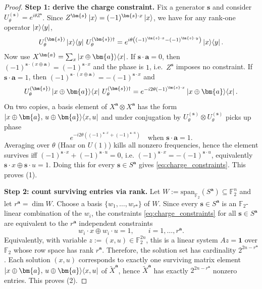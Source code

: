 \documentclass[a4paper,onecolumn,notitlepage,nofootinbib,longbibliography,superscriptaddress, floatfix, pra, aps, 10pt]{revtex4-2}
\newcommand{\vta}{{\bm{a}}}
\newcommand{\vts}{{\bm{s}}}
\begin{document}
\begin{proof}
\textbf{Step 1: derive the charge constraint.}
Fix a generator $\vts$ and consider $U_\theta^{(\vts)}=e^{i\theta Z^\vts}$.
Since $Z^\vts\ket{x}=(-1)^{\vts\cdot x}\ket{x}$, we have for any rank-one operator $\ket{x}\!\bra{y}$,
\[
U_\theta^{(\vts)}\ket{x}\!\bra{y}\,U_\theta^{(\vts)\dagger}
=
e^{i\theta\left((-1)^{\vts\cdot x}-(-1)^{\vts\cdot y}\right)}\ket{x}\!\bra{y}.
\]
Now use $X^\vta=\sum_x\ket{x\oplus\vta}\!\bra{x}$.
If $\vts\cdot\vta=0$, then $(-1)^{\vts\cdot(x\oplus\vta)}=(-1)^{\vts\cdot x}$ and the phase is $1$, i.e.\ $Z^\vts$ imposes no constraint.
If $\vts\cdot\vta=1$, then $(-1)^{\vts\cdot(x\oplus\vta)}=-(-1)^{\vts\cdot x}$ and
\[
U_\theta^{(\vts)}\ket{x\oplus\vta}\!\bra{x}\,U_\theta^{(\vts)\dagger}
=
e^{-i2\theta(-1)^{\vts\cdot x}}\ket{x\oplus\vta}\!\bra{x}.
\]
On two copies, a basis element of $X^\vta\otimes X^\vta$ has the form
$\ket{x\oplus\vta,\,u\oplus\vta}\!\bra{x,u}$ and under conjugation by $U_\theta^{(\vts)}\otimes U_\theta^{(\vts)}$ picks up phase
\[
e^{-i2\theta\left((-1)^{\vts\cdot x}+(-1)^{\vts\cdot u}\right)}
\quad\text{when }\vts\cdot\vta=1.
\]
Averaging over $\theta$ (Haar on $U(1)$) kills all nonzero frequencies, hence the element survives iff
$(-1)^{\vts\cdot x}+(-1)^{\vts\cdot u}=0$, i.e.
$(-1)^{\vts\cdot x}=-(-1)^{\vts\cdot u}$, equivalently $\vts\cdot x\oplus \vts\cdot u=1$.
Doing this for every $\vts\in S^\vta$ gives \eqref{eq:charge_constraints}. This proves (1).

\textbf{Step 2: count surviving entries via rank.}
Let $W:=\mathrm{span}_{\mathbb F_2}(S^\vta)\subseteq\mathbb F_2^n$ and let $r^\vta=\dim W$.
Choose a basis $\{w_1,\dots,w_{r^\vta}\}$ of $W$. Since every $\vts\in S^\vta$ is an $\mathbb F_2$-linear combination of the $w_i$,
the constraints \eqref{eq:charge_constraints} for all $\vts\in S^\vta$ are equivalent to the $r^\vta$ independent constraints
\[
w_i\cdot x \oplus w_i\cdot u = 1,\qquad i=1,\dots,r^\vta.
\]
Equivalently, with variable $z:=(x,u)\in\mathbb F_2^{2n}$, this is a linear system $Az=\mathbf 1$ over $\mathbb F_2$ whose row space has rank $r^\vta$.
Therefore, the solution set has cardinality $2^{2n-r^\vta}$.
Each solution $(x,u)$ corresponds to exactly one surviving matrix element
$\ket{x\oplus\vta,\,u\oplus\vta}\!\bra{x,u}$ of $\widetilde X^\vta$, hence $\widetilde X^\vta$ has exactly $2^{2n-r^\vta}$ nonzero entries.
This proves (2).


\end{proof}
\end{document}
